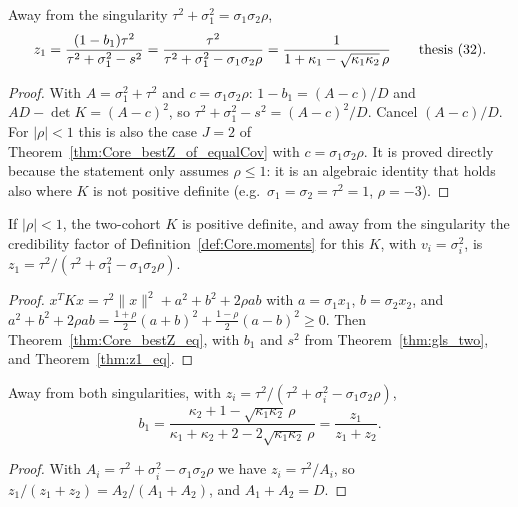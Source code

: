 \begin{theorem}\label{thm:z1_eq}
  \leanok
  Away from the singularity $\tau^2 + \sigma_1^2 = \sigma_1\sigma_2\rho$,
  \[
    z_1 = \frac{(1 - b_1)\tau^2}{\tau^2 + \sigma_1^2 - s^2}
        = \frac{\tau^2}{\tau^2 + \sigma_1^2 - \sigma_1\sigma_2\rho}
        = \frac{1}{1 + \kappa_1 - \sqrt{\kappa_1\kappa_2}\,\rho}
    \qquad\text{thesis~(32).}
  \]
\end{theorem}
\begin{proof}
  \leanok
  With $A = \sigma_1^2 + \tau^2$ and $c = \sigma_1\sigma_2\rho$:
  $1 - b_1 = (A - c)/D$ and $A D - \det K = (A - c)^2$, so
  $\tau^2 + \sigma_1^2 - s^2 = (A - c)^2/D$. Cancel $(A - c)/D$.
  For $|\rho| < 1$ this is also the case $J = 2$ of
  Theorem~\ref{thm:Core_bestZ_of_equalCov} with $c = \sigma_1\sigma_2\rho$.
  It is proved directly because the statement only assumes $\rho \le 1$: it is
  an algebraic identity that holds also where $K$ is not positive definite
  (e.g.\ $\sigma_1 = \sigma_2 = \tau^2 = 1$, $\rho = -3$).
\end{proof}

\begin{theorem}[Eq.\ (32) is eq.\ (26)]\label{thm:two_bestZ_eq}
  \leanok
  If $|\rho| < 1$, the two-cohort $K$ is positive definite, and away from the
  singularity the credibility factor of Definition~\ref{def:Core.moments} for
  this $K$, with $v_i = \sigma_i^2$, is
  $z_1 = \tau^2/(\tau^2 + \sigma_1^2 - \sigma_1\sigma_2\rho)$.
\end{theorem}
\begin{proof}
  \leanok
  $x^TKx = \tau^2\lVert x\rVert^2 + a^2 + b^2 + 2\rho ab$ with $a = \sigma_1x_1$,
  $b = \sigma_2x_2$, and $a^2 + b^2 + 2\rho ab
  = \tfrac{1+\rho}{2}(a+b)^2 + \tfrac{1-\rho}{2}(a-b)^2 \ge 0$. Then
  Theorem~\ref{thm:Core_bestZ_eq}, with $b_1$ and $s^2$ from
  Theorem~\ref{thm:gls_two}, and Theorem~\ref{thm:z1_eq}.
\end{proof}

\begin{theorem}\label{thm:b1_eq_z}
  \leanok
  Away from both singularities, with $z_i = \tau^2/(\tau^2 + \sigma_i^2 - \sigma_1\sigma_2\rho)$,
  \[
    b_1 = \frac{\kappa_2 + 1 - \sqrt{\kappa_1\kappa_2}\,\rho}
               {\kappa_1 + \kappa_2 + 2 - 2\sqrt{\kappa_1\kappa_2}\,\rho}
        = \frac{z_1}{z_1 + z_2}.
  \]
\end{theorem}
\begin{proof}
  \leanok
  With $A_i = \tau^2 + \sigma_i^2 - \sigma_1\sigma_2\rho$ we have $z_i = \tau^2/A_i$,
  so $z_1/(z_1+z_2) = A_2/(A_1 + A_2)$, and $A_1 + A_2 = D$.
\end{proof}

